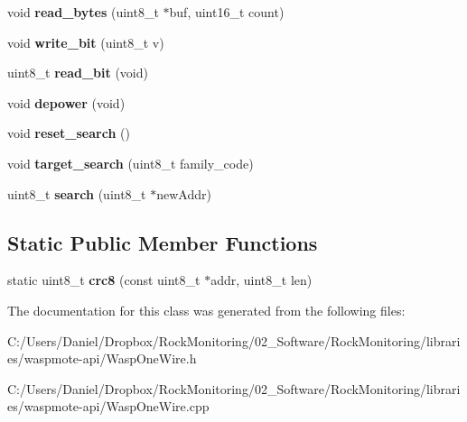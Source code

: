 \begin{DoxyCompactItemize}
\item 
void {\bfseries read\+\_\+bytes} (uint8\+\_\+t $\ast$buf, uint16\+\_\+t count)\hypertarget{class_wasp_one_wire_ab956d57b21721e0112881c14616a1d96}{}\label{class_wasp_one_wire_ab956d57b21721e0112881c14616a1d96}

\item 
void {\bfseries write\+\_\+bit} (uint8\+\_\+t v)\hypertarget{class_wasp_one_wire_ab259b66a0155645c5d5a7d24264e4e52}{}\label{class_wasp_one_wire_ab259b66a0155645c5d5a7d24264e4e52}

\item 
uint8\+\_\+t {\bfseries read\+\_\+bit} (void)\hypertarget{class_wasp_one_wire_af8feb6847acec250e653cede671af942}{}\label{class_wasp_one_wire_af8feb6847acec250e653cede671af942}

\item 
void {\bfseries depower} (void)\hypertarget{class_wasp_one_wire_a0c91b27c1f1b79490d768685b32f7782}{}\label{class_wasp_one_wire_a0c91b27c1f1b79490d768685b32f7782}

\item 
void {\bfseries reset\+\_\+search} ()\hypertarget{class_wasp_one_wire_a8b541f4fc1ea3359c66c807d2db591ad}{}\label{class_wasp_one_wire_a8b541f4fc1ea3359c66c807d2db591ad}

\item 
void {\bfseries target\+\_\+search} (uint8\+\_\+t family\+\_\+code)\hypertarget{class_wasp_one_wire_a2e885ea92eeaf5900ba334efad1e7a67}{}\label{class_wasp_one_wire_a2e885ea92eeaf5900ba334efad1e7a67}

\item 
uint8\+\_\+t {\bfseries search} (uint8\+\_\+t $\ast$new\+Addr)\hypertarget{class_wasp_one_wire_ac59d1774dfd1613f6590d7afd0d65cd4}{}\label{class_wasp_one_wire_ac59d1774dfd1613f6590d7afd0d65cd4}

\end{DoxyCompactItemize}
\subsection*{Static Public Member Functions}
\begin{DoxyCompactItemize}
\item 
static uint8\+\_\+t {\bfseries crc8} (const uint8\+\_\+t $\ast$addr, uint8\+\_\+t len)\hypertarget{class_wasp_one_wire_ad011bd9b1e8d5acf757ea2b6b9e7b158}{}\label{class_wasp_one_wire_ad011bd9b1e8d5acf757ea2b6b9e7b158}

\end{DoxyCompactItemize}


The documentation for this class was generated from the following files\+:\begin{DoxyCompactItemize}
\item 
C\+:/\+Users/\+Daniel/\+Dropbox/\+Rock\+Monitoring/02\+\_\+\+Software/\+Rock\+Monitoring/libraries/waspmote-\/api/Wasp\+One\+Wire.\+h\item 
C\+:/\+Users/\+Daniel/\+Dropbox/\+Rock\+Monitoring/02\+\_\+\+Software/\+Rock\+Monitoring/libraries/waspmote-\/api/Wasp\+One\+Wire.\+cpp\end{DoxyCompactItemize}
